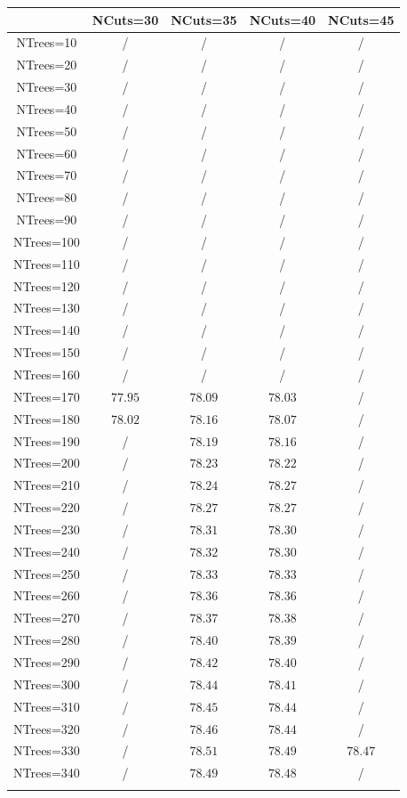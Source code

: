 \centering
\begin{tabular}{ccccc} \toprule\toprule
 & NCuts=30 & NCuts=35 & NCuts=40 & NCuts=45\\\midrule
NTrees=10 &  / &  / &  / &  /\\
NTrees=20 &  / &  / &  / &  /\\
NTrees=30 &  / &  / &  / &  /\\
NTrees=40 &  / &  / &  / &  /\\
NTrees=50 &  / &  / &  / &  /\\
NTrees=60 &  / &  / &  / &  /\\
NTrees=70 &  / &  / &  / &  /\\
NTrees=80 &  / &  / &  / &  /\\
NTrees=90 &  / &  / &  / &  /\\
NTrees=100 &  / &  / &  / &  /\\
NTrees=110 &  / &  / &  / &  /\\
NTrees=120 &  / &  / &  / &  /\\
NTrees=130 &  / &  / &  / &  /\\
NTrees=140 &  / &  / &  / &  /\\
NTrees=150 &  / &  / &  / &  /\\
NTrees=160 &  / &  / &  / &  /\\
NTrees=170 & $77.95$ & $78.09$ & $78.03$ &  /\\
NTrees=180 & $78.02$ & $78.16$ & $78.07$ &  /\\
NTrees=190 &  / & $78.19$ & $78.16$ &  /\\
NTrees=200 &  / & $78.23$ & $78.22$ &  /\\
NTrees=210 &  / & $78.24$ & $78.27$ &  /\\
NTrees=220 &  / & $78.27$ & $78.27$ &  /\\
NTrees=230 &  / & $78.31$ & $78.30$ &  /\\
NTrees=240 &  / & $78.32$ & $78.30$ &  /\\
NTrees=250 &  / & $78.33$ & $78.33$ &  /\\
NTrees=260 &  / & $78.36$ & $78.36$ &  /\\
NTrees=270 &  / & $78.37$ & $78.38$ &  /\\
NTrees=280 &  / & $78.40$ & $78.39$ &  /\\
NTrees=290 &  / & $78.42$ & $78.40$ &  /\\
NTrees=300 &  / & $78.44$ & $78.41$ &  /\\
NTrees=310 &  / & $78.45$ & $78.44$ &  /\\
NTrees=320 &  / & $78.46$ & $78.44$ &  /\\
NTrees=330 &  / & $78.51$ & $78.49$ & $78.47$\\
NTrees=340 &  / & $78.49$ & $78.48$ &  /\\
\bottomrule\bottomrule\\
\end{tabular}
